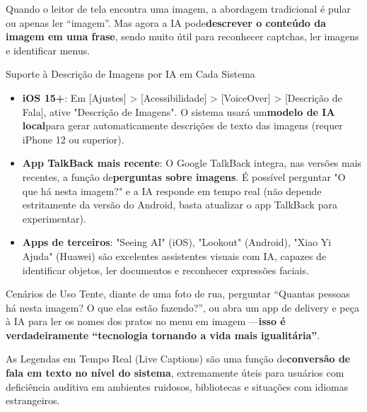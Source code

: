 
Quando o leitor de tela encontra uma imagem, a abordagem tradicional é pular ou apenas ler “imagem”. Mas agora a IA pode\textbf{descrever o conteúdo da imagem em uma frase}, sendo muito útil para reconhecer captchas, ler imagens e identificar menus.

\begin{tcbinfo}{Suporte à Descrição de Imagens por IA em Cada Sistema}
\begin{itemize}
  \item \textbf{iOS 15+}: Em [Ajustes] > [Acessibilidade] > [VoiceOver] > [Descrição de Fala], ative "Descrição de Imagens". O sistema usará um\textbf{modelo de IA local}para gerar automaticamente descrições de texto das imagens (requer iPhone 12 ou superior).
  \item \textbf{App TalkBack mais recente}: O Google TalkBack integra, nas versões mais recentes, a função de\textbf{perguntas sobre imagens}. É possível perguntar "O que há nesta imagem?" e a IA responde em tempo real (não depende estritamente da versão do Android, basta atualizar o app TalkBack para experimentar).
  \item \textbf{Apps de terceiros}: "Seeing AI" (iOS), "Lookout" (Android), "Xiao Yi Ajuda" (Huawei) são excelentes assistentes visuais com IA, capazes de identificar objetos, ler documentos e reconhecer expressões faciais.
\end{itemize}

\end{tcbinfo}

\begin{tcbpractice}{Cenários de Uso}
Tente, diante de uma foto de rua, perguntar “Quantas pessoas há nesta imagem? O que elas estão fazendo?”, ou abra um app de delivery e peça à IA para ler os nomes dos pratos no menu em imagem —\textbf{isso é verdadeiramente “tecnologia tornando a vida mais igualitária”}.

\end{tcbpractice}


As Legendas em Tempo Real (Live Captions) são uma função de\textbf{conversão de fala em texto no nível do sistema}, extremamente úteis para usuários com deficiência auditiva em ambientes ruidosos, bibliotecas e situações com idiomas estrangeiros.

